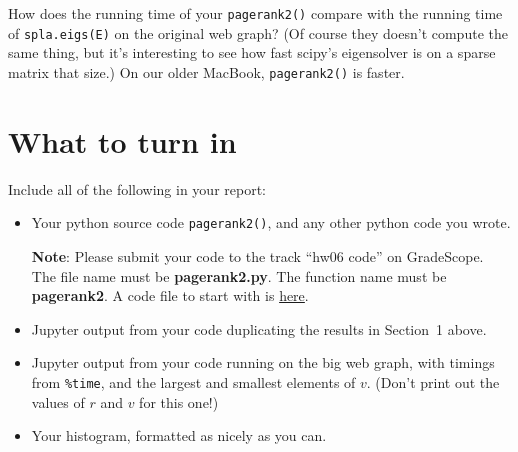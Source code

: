 \documentclass[11pt]{article}
\begin{document}
How does the running time of your {\tt pagerank2()} compare with the
running time of {\tt spla.eigs(E)} on the original web graph?
(Of course they doesn't compute the same thing, but it's interesting
to see how fast scipy's eigensolver is on a sparse matrix that size.)
On our older MacBook, {\tt pagerank2()} is faster.

\section{What to turn in}

Include all of the following in your report:
\begin{itemize}
\item 
Your python source code {\tt pagerank2()}, 
and any other python code you wrote.

\textbf{Note}: Please submit your code to the track ``hw06 code'' on GradeScope.
The file name must be \textbf{pagerank2.py}.
The function name must be \textbf{pagerank2}.
A code file to start with is \href{https://github.com/ucsb-cs111/s19-lecture-files/blob/master/05.21/pagerank2.py}{here}.
\item 
Jupyter output from your code duplicating the results in Section~1 above.
\item 
Jupyter output from your code running on the big web graph,
with timings from {\tt \%time}, and the largest and smallest
elements of $v$.
(Don't print out the values of $r$ and $v$ for this one!)
\item 
Your histogram, formatted as nicely as you can.
\end{itemize}
\end{document}
